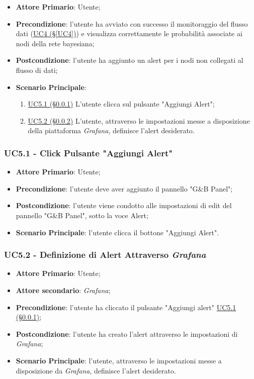 \begin{itemize}
	\item \textbf{Attore Primario}: Utente;
	\item \textbf{Precondizione}:
	l'utente ha avviato con successo il monitoraggio del flusso dati (\hyperref[UC4]				{UC4 (§\ref*{UC4})}) e visualizza correttamente le probabilità associate ai nodi della rete bayesiana;
	\item \textbf{Postcondizione}: l'utente ha aggiunto un alert per i nodi non collegati al flusso di dati;
	\item \textbf{Scenario Principale}:
	\begin{enumerate}
		\item \hyperref[UC5.1]{UC5.1 (§\ref*{UC5.1})}  L'utente clicca sul pulsante "Aggiungi Alert";
		\item \hyperref[UC5.2]{UC5.2 (§\ref*{UC5.2})} L'utente, attraverso le impostazioni messe a disposizione della piattaforma \textit{Grafana}, definisce l'alert desiderato.
	\end{enumerate}
	
\end{itemize}

\subsubsection{UC5.1 - Click Pulsante "Aggiungi Alert"}\label{UC5.1}
\begin{itemize}
	\item \textbf{Attore Primario}: Utente;
	\item \textbf{Precondizione}: l'utente deve aver aggiunto il pannello "G\&B Panel";
	\item \textbf{Postcondizione}: l'utente viene condotto alle impostazioni di edit del pannello 
	"G\&B Panel", sotto la voce Alert;
	\item \textbf{Scenario Principale}: l'utente clicca il bottone "Aggiungi Alert".
\end{itemize}

\subsubsection{UC5.2 - Definizione di Alert Attraverso \textit{Grafana}}\label{UC5.2}
\begin{itemize}
	\item \textbf{Attore Primario}: Utente;
	\item \textbf{Attore secondario}: \textit{Grafana};
	\item \textbf{Precondizione}: l'utente ha cliccato il pulsante "Aggiungi alert" \hyperref[UC5.1]{UC5.1 (§\ref*{UC5.1})};
	\item \textbf{Postcondizione}: l'utente ha creato l'alert attraverso le impostazioni di \textit{Grafana};
	\item \textbf{Scenario Principale}: l'utente, attraverso le impostazioni messe a disposizione da \textit{Grafana}, definisce l'alert desiderato.
\end{itemize}

